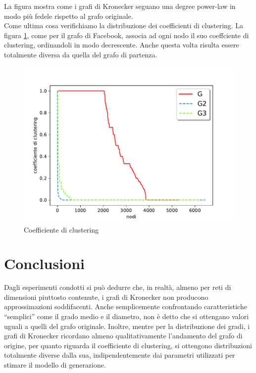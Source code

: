 \documentclass[12pt]{scrartcl}
\begin{document}
La figura mostra come i grafi di Kronecker seguano una degree power-law in modo più fedele rispetto al grafo originale.\\
Come ultima cosa verifichiamo la distribuzione dei coefficienti di clustering. La figura \ref{fig:fig8}, come per il grafo di Facebook, associa ad ogni nodo il suo coeffciente di clustering, ordinandoli in modo decrescente. Anche questa volta risulta essere totalmente diversa da quella del grafo di partenza.

\begin{figure}[H]
	\centering
	\includegraphics[width=0.7\linewidth]{imgs/Figure_8.pdf}
	\caption{Coefficiente di clustering}\label{fig:fig8}
\end{figure}


\section{Conclusioni}

Dagli esperimenti condotti si può dedurre che, in realtà, almeno per reti di dimensioni piuttosto contenute, i grafi di Kronecker non producono approssimazioni soddifacenti. Anche semplicemente confrontando caratteristiche ``semplici'' come il grado medio e il diametro, non è detto che si ottengano valori uguali a quelli del grafo originale. Inoltre, mentre per la distribuzione dei gradi, i grafi di Kronecker ricordano almeno qualitativamente l'andamento del grafo di origine, per quanto riguarda il coefficiente di clustering, si ottengono distribuzioni totalmente diverse dalla sua, indipendentemente dai parametri utilizzati per stimare il modello di generazione.
\end{document}
